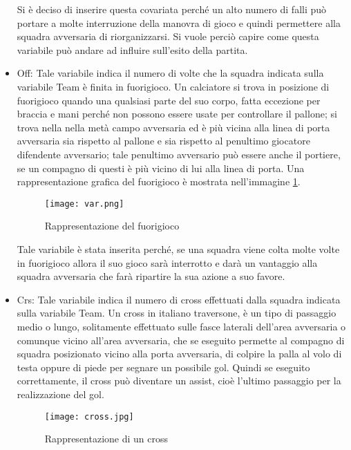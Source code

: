 \begin{itemize}
	Si è deciso di inserire questa covariata perché un alto numero di falli può portare a molte interruzione della manovra di gioco e quindi permettere alla squadra avversaria di riorganizzarsi. Si vuole perciò capire come questa variabile può andare ad influire sull'esito della partita.
	\item \textsf{Off}: Tale variabile indica il numero di volte che la squadra indicata sulla variabile \textsf{Team} è finita in fuorigioco. Un calciatore si trova in posizione di fuorigioco quando una qualsiasi parte del suo corpo, fatta eccezione per braccia e mani perché non possono essere usate per controllare il pallone; si trova nella nella metà campo avversaria ed è più vicina alla linea di porta avversaria sia rispetto al pallone e sia rispetto al penultimo giocatore difendente avversario; tale penultimo avversario può essere anche il portiere, se un compagno di questi è più vicino di lui alla linea di porta. Una rappresentazione grafica del fuorigioco è mostrata nell'immagine \ref{fig:offside}.
	
	\begin{figure}[!ht]
		\begin{center}
			\texttt{[image: var.png]}
			\caption{Rappresentazione del fuorigioco} \label{fig:offside}
		\end{center}
	\end{figure}

	Tale variabile è stata inserita perché, se una squadra viene colta molte volte in fuorigioco allora il suo gioco sarà interrotto e darà un vantaggio alla squadra avversaria che farà ripartire la sua azione a suo favore.
	
	
	\item \textsf{Crs}: Tale variabile indica il numero di cross effettuati dalla squadra indicata sulla variabile \textsf{Team}. Un cross in italiano traversone, è un tipo di passaggio medio o lungo, solitamente effettuato sulle fasce laterali dell'area avversaria o comunque vicino all'area avversaria, che se eseguito permette al compagno di squadra posizionato vicino alla porta avversaria, di colpire la palla al volo di testa oppure di piede per segnare un possibile gol. Quindi se eseguito correttamente, il cross può diventare un assist, cioè l'ultimo passaggio per la realizzazione del gol. 
	
	\begin{figure}[!ht]
		\begin{center}
			\texttt{[image: cross.jpg]}
			\caption{Rappresentazione di un cross} \label{fig:cross}
		\end{center}
	\end{figure}
	

\end{itemize}
